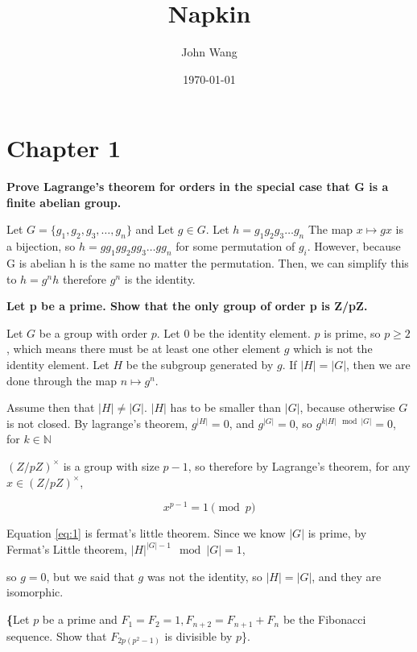 \documentclass[11pt]{article}
\author{John Wang}
\date{\today}
\title{Napkin}
\begin{document}
\maketitle
\tableofcontents

\section{Chapter 1}
\label{sec:org4048113}
\textbf{Prove Lagrange’s theorem for orders in the special case that G is a finite abelian group.}


Let \(G = \{g_1, g_2, g_3, \dots, g_n\}\) and
Let \(g \in G\). Let \(h = g_1g_2g_3\dots g_n\)  The map \(x \mapsto gx\) is a bijection,
so \(h = g g_1 g g_2 g g_3 \dots g g_n\) for some permutation of \(g_i\).  However,  because G is abelian
h is the same no matter the permutation.  Then, we can simplify this to
\(h = g^n h\) therefore \(g^n\) is the identity.

\textbf{Let p be a prime. Show that the only group of order p is Z/pZ.}


Let \(G\) be a group with order \(p\). Let \(0\) be the identity element. \(p\) is prime, so \(p \ge 2\), which means there must
be at least one other element \(g\) which is not the identity element. Let \(H\) be the subgroup
generated by \(g\). If \(|H| = |G|\), then we are done through the map \(n \mapsto g^n\).

Assume then that \(|H| \ne |G|\). \(|H|\) has to be smaller than \(|G|\), because otherwise \(G\) is not closed.
By lagrange's theorem,  \(g^{|H|} = 0\), and \(g^{|G|} = 0\), so \(g ^{k |H| \mod |G|} = 0\), for \(k \in \mathbb{N}\)


\((Z / pZ)^{\times}\) is a group with size \(p - 1\), so therefore by Lagrange's theorem, for any
\(x \in (Z / pZ)^{\times}\),

\begin{equation}
\label{eq:1}
x^{p-1} = 1 \pmod p
\end{equation}

Equation \ref{eq:1} is fermat's little theorem.
Since we know \(|G|\) is prime, by Fermat's Little theorem, \(|H|^{|G| - 1} \mod |G| = 1\),

so \(g = 0\), but we said that \(g\) was not the identity, so \(|H| = |G|\), and they
are isomorphic.


\textbf\{Let \(p\) be a prime and \(F_1 = F_2 = 1, F_{n+2} = F_{n+1} + F_n\)
 be the Fibonacci sequence. Show that \(F_{2p(p^2-1)}\) is divisible by \(p\)\}.
\end{document}
